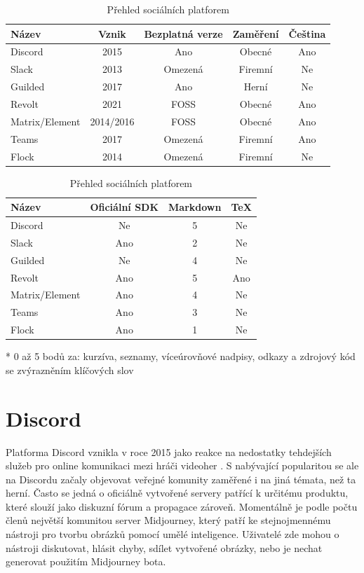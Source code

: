 \documentclass[FM]{tulthesis}
\begin{document}
	\begin{table}[ht]
		\centering
		\caption{Přehled sociálních platforem}\medskip
		\begin{threeparttable}
			\begin{tabular}{ l c c c c }
				\textbf{Název}&\textbf{Vznik}&\textbf{Bezplatná verze}&\textbf{Zaměření}&\textbf{Čeština}\\\hline
				Discord&2015&Ano&Obecné&Ano\\
				Slack&2013&Omezená&Firemní&Ne\\
				Guilded&2017&Ano&Herní&Ne\\
				Revolt&2021&FOSS&Obecné&Ano\\
				Matrix/Element&2014/2016&FOSS&Obecné&Ano\\
				Teams&2017&Omezená&Firemní&Ano\\
				Flock&2014&Omezená&Firemní&Ne\\
			\hline\end{tabular}
			\bigskip%
		
			\begin{tabular}{ l c c c }
				\textbf{Název}&\textbf{Oficiální SDK}&\textbf{Markdown}\tnote{*}&\textbf{TeX}\\\hline
				Discord&Ne&5&Ne\\
				Slack&Ano&2&Ne\\
				Guilded&Ne&4&Ne\\
				Revolt&Ano&5&Ano\\
				Matrix/Element&Ano&4&Ne\\
				Teams&Ano&3&Ne\\
				Flock&Ano&1&Ne\\
			\hline\end{tabular}			
			\begin{tablenotes}
				\item[*] 0 až 5 bodů za: kurzíva, seznamy, víceúrovňové nadpisy, odkazy a zdrojový kód se zvýrazněním klíčových slov
			\end{tablenotes}
		\end{threeparttable}
	\end{table}
	
	\section{Discord}
	
	Platforma Discord vznikla v roce 2015 jako reakce na nedostatky tehdejších služeb pro online komunikaci mezi hráči videoher \cite{lit_Discord}. S nabývající popularitou se ale na Discordu začaly objevovat veřejné komunity zaměřené i na jiná témata, než ta herní. Často se jedná o oficiálně vytvořené servery patřící k určitému produktu, které slouží jako diskuzní fórum a propagace zároveň. Momentálně je podle počtu členů největší komunitou server Midjourney, který patří ke stejnojmennému nástroji pro tvorbu obrázků pomocí umělé inteligence. Uživatelé zde mohou o nástroji diskutovat, hlásit chyby, sdílet vytvořené obrázky, nebo je nechat generovat použitím Midjourney bota.
	
\end{document}
